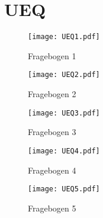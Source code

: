 \section{UEQ}
\label{sec:ueqs}

\begin{figure}[h!]
\texttt{[image: UEQ1.pdf]}
\caption{\label{fig:UEQ1}Fragebogen 1}
\end{figure}
\begin{figure}[h!]
\texttt{[image: UEQ2.pdf]}
\caption{\label{fig:UEQ2}Fragebogen 2}
\end{figure}
\begin{figure}[h!]
\texttt{[image: UEQ3.pdf]}
\caption{\label{fig:UEQ3}Fragebogen 3}
\end{figure}
\begin{figure}[h!]
\texttt{[image: UEQ4.pdf]}
\caption{\label{fig:UEQ4}Fragebogen 4}
\end{figure}
\begin{figure}[h!]
\texttt{[image: UEQ5.pdf]}
\caption{\label{fig:UEQ5}Fragebogen 5}
\end{figure}

